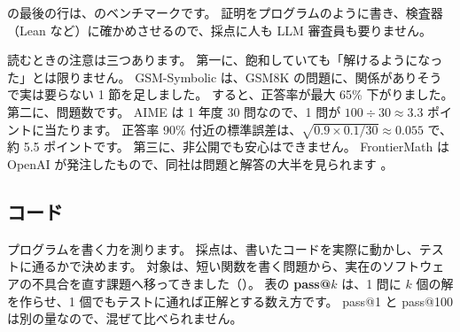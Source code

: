 の最後の行は、のベンチマークです。
証明をプログラムのように書き、検査器（Lean など）に確かめさせるので、採点に人も LLM 審査員も要りません。

読むときの注意は三つあります。
第一に、飽和していても「解けるようになった」とは限りません。
GSM-Symbolic \cite{mirzadeh2024gsmsymbolic} は、GSM8K の問題に、関係がありそうで実は要らない 1 節を足しました。
すると、正答率が最大 65\% 下がりました。
第二に、問題数です。
AIME は 1 年度 30 問なので、1 問が $100\div30\approx3.3$ ポイントに当たります。
正答率 90\% 付近の標準誤差は、$\sqrt{0.9\times0.1/30}\approx0.055$ で、約 5.5 ポイントです。
第三に、非公開でも安心はできません。
FrontierMath は OpenAI が発注したもので、同社は問題と解答の大半を見られます \cite{epoch2025frontiermath}。

\subsection{コード}\label{sec:bm-code}

プログラムを書く力を測ります。
採点は、書いたコードを実際に動かし、テストに通るかで決めます。
対象は、短い関数を書く問題から、実在のソフトウェアの不具合を直す課題へ移ってきました（）。
表の \textbf{pass@$k$} は、1 問に $k$ 個の解を作らせ、1 個でもテストに通れば正解とする数え方です。
pass@1 と pass@100 は別の量なので、混ぜて比べられません。

